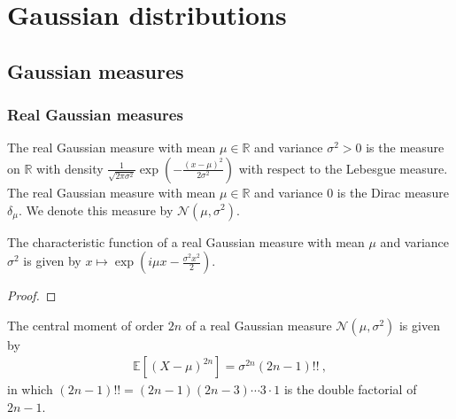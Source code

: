 \chapter{Gaussian distributions}
\label{chap:gaussian}

\section{Gaussian measures}
\label{sec:gaussian_measures}

\subsection{Real Gaussian measures}

\begin{definition}\label{def:gaussianReal}
  \mathlibok
  The real Gaussian measure with mean $\mu \in \mathbb{R}$ and variance $\sigma^2 > 0$ is the measure on $\mathbb{R}$ with density $\frac{1}{\sqrt{2 \pi \sigma^2}} \exp\left(-\frac{(x - \mu)^2}{2 \sigma^2}\right)$ with respect to the Lebesgue measure.
  The real Gaussian measure with mean $\mu \in \mathbb{R}$ and variance $0$ is the Dirac measure $\delta_\mu$.
  We denote this measure by $\mathcal{N}(\mu, \sigma^2)$.
\end{definition}


\begin{lemma}\label{lem:charFun_gaussianReal}
  \mathlibok
The characteristic function of a real Gaussian measure with mean $\mu$ and variance $\sigma^2$ is given by
$x \mapsto \exp\left(i \mu x - \frac{\sigma^2 x^2}{2}\right)$.
\end{lemma}

\begin{proof}\leanok

\end{proof}


\begin{lemma}\label{lem:centralMoment_two_mul_gaussianReal}
The central moment of order $2n$ of a real Gaussian measure $\mathcal{N}(\mu, \sigma^2)$ is given by
\begin{align*}
  \mathbb{E}[(X - \mu)^{2n}] = \sigma^{2n} (2n - 1)!! \: ,
\end{align*}
in which $(2n - 1)!! = (2n - 1)(2n - 3) \cdots 3 \cdot 1$ is the double factorial of $2n - 1$.
\end{lemma}

